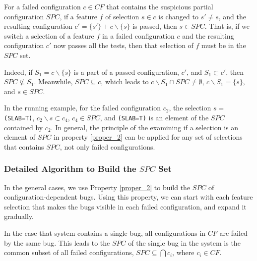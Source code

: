 
\begin{Property}
\label{proper_2}
For a failed configuration $c \in CF$ that contains the suspicious
partial configuration $SPC$, if a feature $f$ of selection $s \in c$
is changed to $s' \neq s$, and the resulting configuration $c' =
\{s'\}+c \backslash \{s\}$ is passed, then $s \in SPC$. That is, if we
switch a selection of a feature $f$ in a failed configuration $c$ and
the resulting configuration $c'$ now passes all the tests, then that
selection of $f$ must be in the $SPC$ set.
\end{Property}

 Indeed, if $S_1 = c \backslash \{s\}$ is a part
of a passed configuration, $c'$, and $S_1 \subset c'$, then $SPC \not
\subseteq S_1$. Meanwhile, $SPC \subseteq c$, which leads to $c
\backslash {S_1 }\cap SPC \neq \emptyset$, $c \backslash {S_1}=\{s\}$,
and $s \in SPC$.
%

In the running example, for the failed configuration $c_2$, the
selection $s=$\texttt{(SLAB=T)}, $c_2 \backslash s \subset c_4$, $c_4
\in SPC$, and \texttt{(SLAB=T)} is an element of the $SPC$ contained
by $c_2$. In general, the principle of the examining if a selection is
an element of $SPC$ in property \ref{proper_2} can be applied for any
set of selections that contains $SPC$, not only failed configurations.
%

\subsubsection{Detailed Algorithm to Build the $SPC$ Set}

In the general cases, we use Property \ref{proper_2} to build the $SPC$
of configuration-dependent bugs. Using this property, we can start
with each feature selection that makes the bugs visible in each failed
configuration, and expand it gradually.
%

In the case that system contains a single bug, all configurations in
$CF$ are failed by the same bug. This leads to the $SPC$ of the single
bug in the system is the common subset of all failed configurations,
$SPC \subseteq \bigcap {c_i}$, where $c_i \in CF$.


